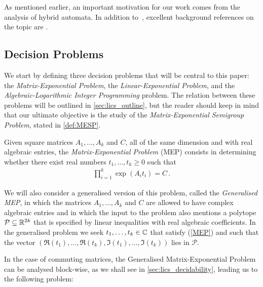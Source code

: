 As mentioned earlier, an important motivation for our work comes from
the analysis of hybrid automata. In addition to~\cite{Alu15},
excellent background references on the topic are
\cite{HenzingerSTOC,HenzingerLICS}.

\subsection{Decision Problems}

We start by defining three decision problems that will be central to this paper: the \emph{Matrix-Exponential Problem},
the \emph{Linear-Exponential Problem}, and the
\emph{Algebraic-Logarithmic Integer Programming} problem.
The relation between these problems will be outlined in \cref{sec:lics_outline}, but the reader should keep in mind that our ultimate objective is the study of the \emph{Matrix-Exponential Semigroup Problem}, stated in \cref{def:MESP}.

\begin{definition}
  Given square matrices $A_{1}, \ldots, A_{k}$ and $C$, all of the same
  dimension and with real algebraic entries,
  the \emph{Matrix-Exponential Problem} (MEP) consists in determining
  whether there exist real numbers $t_1,\ldots,t_k \geq 0$ such that
\begin{align}
\label{MEP}
\prod \limits_{i=1}^{k} \exp(A_{i} t_{i}) = C \, .
\end{align}
\label{def:MEP}
\end{definition}

We will also consider a generalised version of this problem, called
the \emph{Generalised MEP}, in which the matrices $A_1,\ldots,A_k$ and
$C$ are allowed to have complex algebraic entries and in which the
input to the problem also mentions a polytope
$\mathcal{P}\subseteq\mathbb{R}^{2k}$ that is specified by linear
inequalities with real algebraic coefficients.  In the generalised problem
we seek $t_1,\ldots,t_k \in \mathbb{C}$ that satisfy (\ref{MEP}) and
such that the vector
$(\Re(t_1),\ldots,\Re(t_k),
\Im(t_1),\ldots,\Im(t_k))$ lies in $\mathcal{P}$.

In the case of commuting matrices, the Generalised Matrix-Exponential
Problem can be analysed block-wise, as we shall see in \cref{sec:lics_decidability}, leading us to the following
problem:

